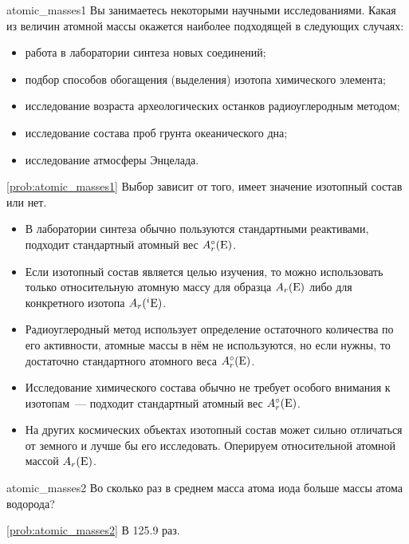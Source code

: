 \begin{problem}{}{atomic_masses1}
    Вы занимаетесь некоторыми научными исследованиями. Какая из величин атомной массы окажется наиболее подходящей в следующих случаях:
    \begin{itemize}
        \item работа в лаборатории синтеза новых соединений;
        \item подбор способов обогащения (выделения) изотопа химического элемента;
        \item исследование возраста археологических останков радиоуглеродным методом;
        \item исследование состава проб грунта океанического дна;
        \item исследование атмосферы Энцелада.
    \end{itemize}
    \begin{sol}{\ref{prob:atomic_masses1}}
        Выбор зависит от того, имеет значение изотопный состав или нет.
        \begin{itemize}
            \item В лаборатории синтеза обычно пользуются стандартными реактивами, подходит стандартный атомный вес $A_{r}^{\circ}(\ce{E})$.
            \item Если изотопный состав является целью изучения, то можно использовать только относительную атомную массу для образца $A_r(\ce{E})$ либо для конкретного изотопа $A_r({}^i\ce{E})$.
            \item Радиоуглеродный метод использует определение остаточного количества  по его активности, атомные массы в нём не используются, но если нужны, то достаточно стандартного атомного веса $A_{r}^{\circ}(\ce{E})$.
            \item Исследование химического состава обычно не требует особого внимания к изотопам~--- подходит стандартный атомный вес $A_{r}^{\circ}(\ce{E})$.
            \item На других космических объектах изотопный состав может сильно отличаться от земного и лучше бы его исследовать. Оперируем относительной атомной массой $A_r(\ce{E})$.
        \end{itemize}
    \end{sol}
\end{problem}

\begin{problem}{}{atomic_masses2}
    Во сколько раз в среднем масса атома иода больше массы атома водорода?
    \begin{sol}{\ref{prob:atomic_masses2}}
        В \num{125,9} раз.
    \end{sol}
\end{problem}

